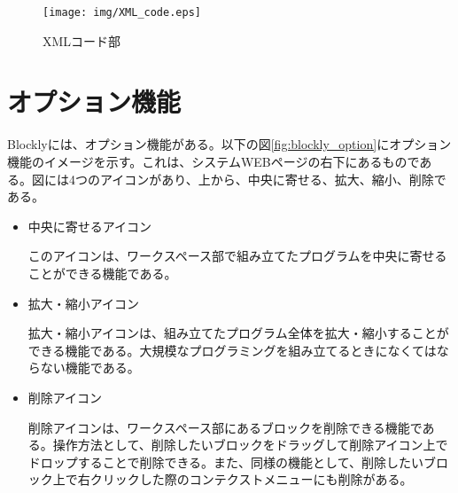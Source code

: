 \documentclass{eniepaper}
\begin{document}



\begin{figure}[h]
\begin{center}
\texttt{[image: img/XML\_code.eps]}
\caption{XMLコード部}%
\label{fig:XML_code}
\end{center}%
\end{figure}%
   
   \section{オプション機能}
   
Blocklyには、オプション機能がある。以下の図\ref{fig:blockly_option}にオプション機能のイメージを示す。これは、システムWEBページの右下にあるものである。図には4つのアイコンがあり、上から、中央に寄せる、拡大、縮小、削除である。

\begin{itemize}

\item 中央に寄せるアイコン

このアイコンは、ワークスペース部で組み立てたプログラムを中央に寄せることができる機能である。

\item 拡大・縮小アイコン

拡大・縮小アイコンは、組み立てたプログラム全体を拡大・縮小することができる機能である。大規模なプログラミングを組み立てるときになくてはならない機能である。

\item 削除アイコン

削除アイコンは、ワークスペース部にあるブロックを削除できる機能である。操作方法として、削除したいブロックをドラッグして削除アイコン上でドロップすることで削除できる。また、同様の機能として、削除したいブロック上で右クリックした際のコンテクストメニューにも削除がある。

\end{itemize} 
\end{document}
